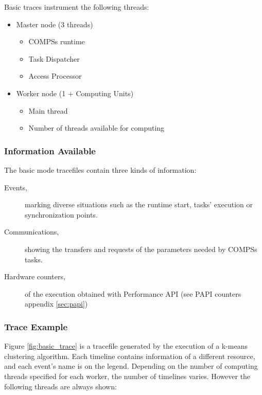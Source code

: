 Basic traces instrument the following threads:

\begin{itemize}
 \item Master node (3 threads)
 \begin {itemize}
 \item COMPSs runtime
 \item Task Dispatcher
 \item Access Processor
 \end{itemize}
 \item Worker node (1 + Computing Units)
 \begin{itemize}
  \item Main thread
  \item Number of threads available for computing
 \end{itemize}
\end{itemize}

\subsubsection{Information Available}

The basic mode tracefiles contain three kinds of information:

\begin{description}
 \item [Events,] marking diverse situations such as the runtime start, tasks' execution or synchronization points.
 \item [Communications,] showing the transfers and requests of the parameters needed by COMPSs tasks.
 \item [Hardware counters,] of the execution obtained with Performance API (see PAPI counters appendix \ref{sec:papi})
\end{description}


\subsubsection{Trace Example}

Figure \ref{fig:basic_trace} is a tracefile generated by the execution of a k-means clustering algorithm. Each timeline contains information of a 
different resource, and each event's name is on the legend. Depending on the number of computing threads specified for each worker, the number of timelines varies. 
However the following threads are always shown:



